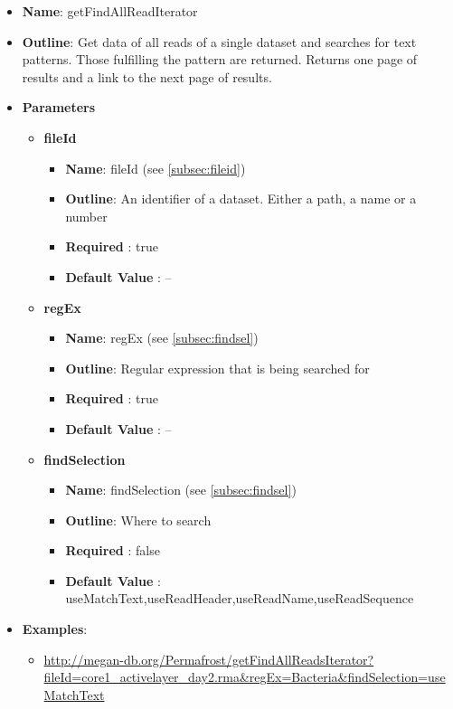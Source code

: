 \documentclass[11pt]{article}
\begin{document}
\begin{itemize}
	\item \textbf{Name}: getFindAllReadIterator
	\item \textbf{Outline}: Get data of all reads of a single dataset and searches for text patterns. Those fulfilling the pattern are returned. Returns one page of results and a link to the next page of results.
	\item \textbf{Parameters}
		\begin{itemize}
			\item \textbf{fileId}
				\begin{itemize}
					\item \textbf{Name}: fileId (see \ref{subsec:fileid})
					\item \textbf{Outline}: An identifier of a dataset. Either a path, a name or a number
					\item \textbf{Required} : true
					\item \textbf{Default Value} : --
				\end{itemize}
			\item \textbf{regEx}
				\begin{itemize}
					\item \textbf{Name}: regEx (see \ref{subsec:findsel})
					\item \textbf{Outline}: Regular expression that is being searched for
					\item \textbf{Required} : true
					\item \textbf{Default Value} : --
				\end{itemize}
			\item \textbf{findSelection}
				\begin{itemize}
					\item \textbf{Name}: findSelection (see \ref{subsec:findsel})
					\item \textbf{Outline}: Where to search
					\item \textbf{Required} : false
					\item \textbf{Default Value} : useMatchText,useReadHeader,useReadName,useReadSequence
				\end{itemize}

		\end{itemize}
	\item \textbf{Examples}:
		\begin{itemize}
			\item \url{http://megan-db.org/Permafrost/getFindAllReadsIterator?fileId=core1_activelayer_day2.rma&regEx=Bacteria&findSelection=useMatchText}
		\end{itemize}
\end{itemize}
\end{document}

